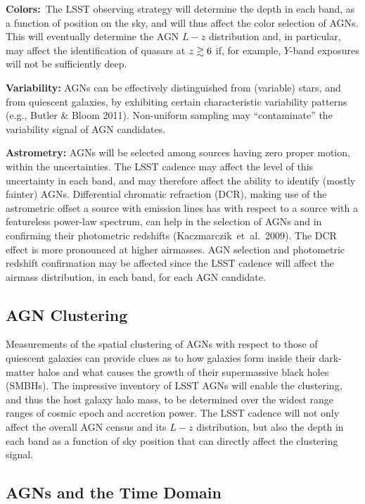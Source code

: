 {\bf Colors:}~The LSST observing strategy will determine the depth in each band, as a function of position on the sky, and will thus affect
the color selection of AGNs. This will eventually determine the AGN $L-z$ distribution and, in particular, may affect the identification
of quasars at $z\gtrsim 6$ if, for example, $Y$-band exposures will not be sufficiently deep.

{\bf Variability:} AGNs can be effectively distinguished from (variable) stars, and from quiescent galaxies, by exhibiting certain characteristic variability patterns (e.g., Butler \& Bloom 2011). Non-uniform sampling may ``contaminate'' the variability signal of AGN candidates.

{\bf Astrometry:} AGNs will be selected among sources having zero proper motion, within the uncertainties. The LSST cadence
may affect the level of this uncertainty in each band, and may therefore affect the ability to identify (mostly fainter) AGNs.
%
Differential chromatic refraction (DCR), making use of the astrometric offset a source with emission lines has with respect to
a source with a featureless power-law spectrum, can help in the selection of AGNs and in confirming their photometric redshifts (Kaczmarczik~et~al.~2009). The DCR effect is more pronounced at higher airmasses. AGN selection and photometric redshift confirmation may be affected since the LSST cadence will affect the airmass distribution, in each band, for each AGN candidate.

\subsection{AGN Clustering}
\label{sec:\secname:clustering}

\noindent Measurements of the spatial clustering of AGNs with respect to those of quiescent galaxies can provide clues as to how galaxies
form inside their dark-matter halos and what causes the growth of their supermassive black holes (SMBHs). The impressive inventory 
of LSST AGNs will enable the clustering, and thus the host galaxy halo mass, to be determined over the widest range ranges of cosmic
epoch and accretion power.
%
The LSST cadence will not only affect the overall AGN census and its $L-z$ distribution, but also the
depth in each band as a function of sky position that can directly affect the clustering signal.

\subsection{AGNs and the Time Domain}
\label{sec:\secname:time}

